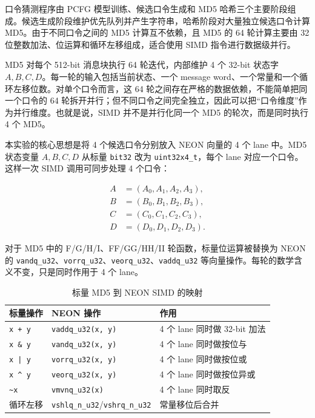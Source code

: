 \documentclass[UTF8,a4paper,12pt]{ctexart}
\begin{document}
口令猜测程序由 PCFG 模型训练、候选口令生成和 MD5 哈希三个主要阶段组成。候选生成阶段维护优先队列并产生字符串，哈希阶段对大量独立候选口令计算 MD5。由于不同口令之间的 MD5 计算互不依赖，且 MD5 的 64 轮计算主要由 32 位整数加法、位运算和循环左移组成，适合使用 SIMD 指令进行数据级并行。

MD5 对每个 512-bit 消息块执行 64 轮迭代，内部维护 4 个 32-bit 状态字 $A,B,C,D$。每一轮的输入包括当前状态、一个 message word、一个常量和一个循环左移位数。对单个口令而言，这 64 轮之间存在严格的数据依赖，不能简单把同一个口令的 64 轮拆开并行；但不同口令之间完全独立，因此可以把“口令维度”作为并行维度。也就是说，SIMD 并不是并行化同一个 MD5 的轮次，而是同时执行 4 个 MD5。

本实验的核心思想是将 4 个候选口令分别放入 NEON 向量的 4 个 lane 中。MD5 状态变量 $A,B,C,D$ 从标量 \texttt{bit32} 改为 \texttt{uint32x4\_t}，每个 lane 对应一个口令。这样一次 SIMD 调用可同步处理 4 个口令：

\[
\begin{aligned}
A &= (A_0,A_1,A_2,A_3),\\
B &= (B_0,B_1,B_2,B_3),\\
C &= (C_0,C_1,C_2,C_3),\\
D &= (D_0,D_1,D_2,D_3).
\end{aligned}
\]

对于 MD5 中的 F/G/H/I、FF/GG/HH/II 轮函数，标量位运算被替换为 NEON 的 \texttt{vandq\_u32}、\texttt{vorrq\_u32}、\texttt{veorq\_u32}、\texttt{vaddq\_u32} 等向量操作。每轮的数学含义不变，只是同时作用于 4 个 lane。

\begin{table}[H]
    \centering
    \caption{标量 MD5 到 NEON SIMD 的映射}
    \begin{tabular}{lll}
        \toprule
        标量操作 & NEON 操作 & 作用 \\
        \midrule
        \texttt{x + y} & \texttt{vaddq\_u32(x, y)} & 4 个 lane 同时做 32-bit 加法 \\
        \texttt{x \& y} & \texttt{vandq\_u32(x, y)} & 4 个 lane 同时做按位与 \\
        \texttt{x | y} & \texttt{vorrq\_u32(x, y)} & 4 个 lane 同时做按位或 \\
        \texttt{x \textasciicircum{} y} & \texttt{veorq\_u32(x, y)} & 4 个 lane 同时做按位异或 \\
        \texttt{\~{}x} & \texttt{vmvnq\_u32(x)} & 4 个 lane 同时取反 \\
        循环左移 & \texttt{vshlq\_n\_u32}/\texttt{vshrq\_n\_u32} & 常量移位后合并 \\
        \bottomrule
    \end{tabular}
\end{table}
\end{document}
